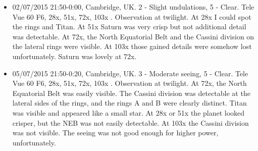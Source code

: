 \begin{itemize}
\item 02/07/2015 21:50-0:00, Cambridge, UK. 2 - Slight undulations, 5 - Clear. Tele Vue 60 F6, 28x, 51x, 72x, 103x . Observation at twilight. At 28x I could spot the rings and Titan. At 51x Saturn was very crisp but not additional detail was detectable. At 72x, the North Equatorial Belt and the Cassini division on the lateral rings were visible. At 103x those gained details were somehow lost unfortunately. Saturn was lovely at 72x.
\item 05/07/2015 21:50-0:20, Cambridge, UK. 3 - Moderate seeing, 5 - Clear. Tele Vue 60 F6, 28x, 51x, 72x, 103x . Observation at twilight. At 72x, the North Equatorial Belt was easily visible. The Cassini division was detectable at the lateral sides of the rings, and the rings A and B were clearly distinct. Titan was visible and appeared like a small star. At 28x or 51x the planet looked crisper, but the NEB was not easily detectable. At 103x the Cassini division was not visible. The seeing was not good enough for higher power, unfortunately.
\end{itemize}
